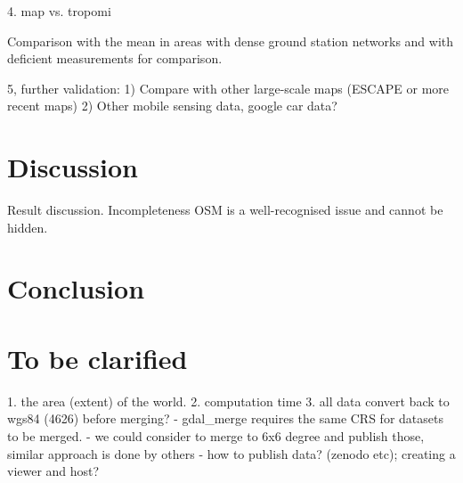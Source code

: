 \documentclass{article}
\begin{document}

4. map vs. tropomi 

Comparison with the mean in areas with dense ground station networks and with deficient measurements for comparison.



					
5, further validation: 
1)	Compare with other large-scale maps (ESCAPE or more recent maps)
2)	Other mobile sensing data, google car data? 


\section{Discussion}
Result discussion. 
Incompleteness OSM is a well-recognised issue and cannot be hidden. 


\section{Conclusion}



 \section{To be clarified}

 1. the area (extent) of the world.   
 2. computation time
 3. all data convert back to wgs84 (4626) before merging?
 - gdal\_merge requires the same CRS for datasets to be merged. 
- we could consider to merge to 6x6 degree and publish those, similar approach is done by others
- how to publish data? (zenodo etc); creating a viewer and host?
\end{document}
